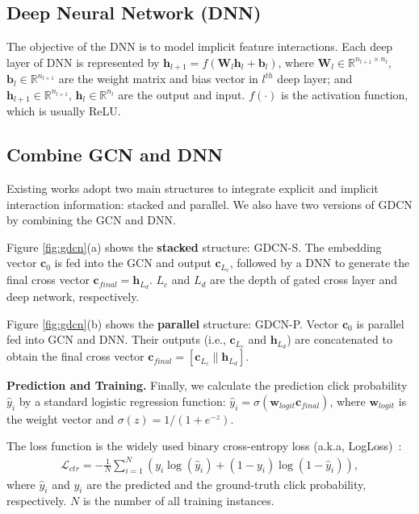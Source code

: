 \documentclass[sigconf]{acmart}
\begin{document}
\subsection{Deep Neural Network (DNN)}
The objective of the DNN is to model implicit feature interactions. Each deep layer of DNN is represented by $\mathbf{h}_{l+1} = f(\mathbf{W}_l\mathbf{h}_l+\mathbf{b}_l)$, where $\mathbf{W}_l \in \mathbb{R}^{n_{l+1}\times n_{l}}$, $\mathbf{b}_{l} \in \mathbb{R}^{n_{l+1}}$ are the weight matrix and bias vector in $l^{th}$ deep layer; and $\mathbf{h}_{l+1} \in \mathbb{R}^{n_{l+1}}$, $\mathbf{h}_{l} \in \mathbb{R}^{n_{l}}$ are the output and input. $f(\cdot)$ is the activation function, which is usually ReLU. 



\subsection{Combine GCN and DNN}
Existing works adopt two main structures to integrate explicit and implicit interaction information: stacked and parallel. We also have two versions of GDCN by combining the GCN and DNN. 

Figure  \ref{fig:gdcn}(a) shows the \textbf{stacked} structure: GDCN-S.
The embedding vector $\mathbf{c}_0$ is fed into the GCN and output $\mathbf{c}_{L_c}$, followed by a DNN to generate the final cross vector $\mathbf{c}_{final} = \mathbf{h}_{L_d}$. $L_c$ and $L_d$ are the depth of gated cross layer and deep network, respectively. 

Figure \ref{fig:gdcn}(b) shows the \textbf{parallel} structure: GDCN-P. Vector $\mathbf{c}_0$ is parallel fed into GCN and DNN. Their outputs (i.e., $\mathbf{c}_{L_c}$ and $\mathbf{h}_{L_d}$) are concatenated to obtain the final cross vector $\mathbf{c}_{final}=[\mathbf{c}_{L_c}\parallel\mathbf{h}_{L_d}]$.


\textbf{Prediction and Training.} Finally, we calculate the prediction click probability $\hat{y}_i$ by a standard logistic regression function: $\hat{y}_i = \sigma(\mathbf{w}_{logit}\mathbf{c}_{final})$, where $\mathbf{w}_{logit}$ is the weight vector and $\sigma(z) ={1}/(1+e^{-z})$. 

The loss function is the widely used binary cross-entropy loss (a.k.a, LogLoss)~\cite{wang2021dcnm, liu2019fgcnn, zhu2022bars}: 
\begin{align}
\textstyle
\mathcal{L}_{ctr} =-\frac{1}{N}\sum_{i=1}^N 
\left({y_i} 
    \log\left(\hat{y}_i \right) 
    +\left( 1-y_i \right) \log \left( 1-\hat{y}_i\right)
\right),
\end{align}
where $\hat{y}_i$ and $y_i$ are the predicted and the ground-truth click probability, respectively. $N$ is the number of all training instances.
\end{document}
